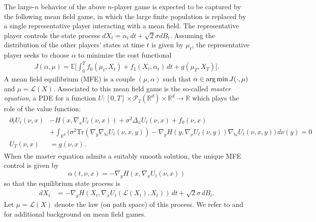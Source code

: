 \documentclass[11pt,reqno]{amsart}
\numberwithin{equation}{section}
\theoremstyle{definition}
\def\E{{\mathbb E}}
\def\R{{\mathbb R}}
\def\L{{\mathcal L}}
\def\Law{\mathcal{L}}
\newcommand{\argmin}{\operatornamewithlimits{arg\,min}}
\newcommand{\wgrad}{\nabla_{\W}}
\newcommand{\W}{\mathbb W}
\begin{document}
The large-$n$ behavior of the above $n$-player game is expected to be captured by the following mean field game, in which the large finite population is replaced by a single representative player interacting with a mean field.
The representative player controls the state process $dX_t=\alpha_t\,dt+\sqrt 2 \sigma dB_t$. Assuming the distribution of the other players' states at time $t$ is given by $\mu_t$, the representative player seeks to choose $\alpha$ to minimize the cost functional
\begin{align*}
    J(\alpha,\mu)= \E\bigg[\int_0^T f_0(\mu_t,X_t)+f_1(X_t,\alpha_t)\,dt+g(\mu_T, X_T)\bigg].
\end{align*}
A mean field equilibrium (MFE) is a couple $(\mu,\alpha)$ such that $\alpha \in \argmin J(\cdot,\mu)$ and $\mu=\Law(X)$. Associated to this mean field game is the so-called \emph{master equation}, a PDE for a function $U : [0,T] \times \mathcal{P}_2(\R^d) \times \R^d \to \R$ which plays the role of the value function:
\begin{align}
\label{eq: Master Equation}
\begin{split}
\partial_t U_t(\nu,x)&-H(x,\nabla_x U_t(\nu,x))+\sigma^2 \Delta_x U_t(\nu,x)+f_0(\nu,x) \\
    &+\int_{\R^d} \Big(\sigma^2\text{Tr}(\nabla_y \wgrad U_t(\nu,x,y)) - \nabla_yH(y,\nabla_xU_t(\nu,y)) \wgrad U_t(\nu,x,y)\Big)\,d\nu(y)=0 \\
    U_T(\nu,x)&=g(\nu,x).
\end{split}
\end{align}
When the master equation admits a suitably smooth solution, the unique MFE control is given by 
\begin{equation}
    \label{eq: controls in MFE}
    \alpha(t,\nu,x)=-\nabla_y H(x,\nabla_x U_t(\nu,x))
\end{equation} so that the equilibrium state process is 
\begin{align}
    \label{eq: trajectories in MFE}
    dX_t&=-\nabla_y H(X_t,\nabla_x U_t(\Law(X_t),X_t))\,dt+\sqrt 2 \sigma\,dB_t.
\end{align}
Let $\mu=\L(X)$ denote the law (on path space) of this process. We refer  to \cite{MasterEquation} and \cite{Carmonabook1} for additional background on mean field games.
\end{document}
